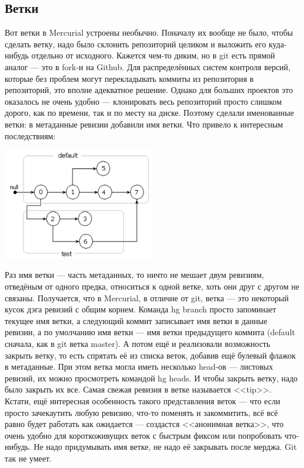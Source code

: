 \documentclass[a5paper]{article}
\begin{document}
\subsection{Ветки}

Вот ветки в Mercurial устроены необычно. Поначалу их вообще не было, чтобы сделать ветку, надо было склонить репозиторий целиком и выложить его куда-нибудь отдельно от исходного. Кажется чем-то диким, но в git есть прямой аналог --- это в fork-и на Github. Для распределённых систем контроля версий, которые без проблем могут перекладывать коммиты из репозитория в репозиторий, это вполне адекватное решение. Однако для больших проектов это оказалось не очень удобно --- клонировать весь репозиторий просто слишком дорого, как по времени, так и по месту на диске. Поэтому сделали именованные ветки: в метаданные ревизии добавили имя ветки. Что привело к интересным последствиям:

\begin{center}
	\includegraphics[width=0.5\textwidth]{mercurialBranches.png}
\end{center}

Раз имя ветки --- часть метаданных, то ничто не мешает двум ревизиям, отведёным от одного предка, относиться к одной ветке, хоть они друг с другом не связаны. Получается, что в Mercurial, в отличие от git, ветка --- это некоторый кусок дэга ревизий с общим корнем. Команда hg branch просто запоминает текущее имя ветки, а следующий коммит записывает имя ветки в данные ревизии, а по умолчанию имя ветки --- имя ветки предыдущего коммита (default сначала, как в git ветка master). А потом ещё и реализовали возможность закрыть ветку, то есть спрятать её из списка веток, добавив ещё булевый флажок в метаданные. При этом ветка могла иметь несколько head-ов --- листовых ревизий, их можно просмотреть командой hg heads. И чтобы закрыть ветку, надо было закрыть их все. Самая свежая ревизия в ветке называется <<tip>>. Кстати, ещё интересная особенность такого представления веток --- что если просто зачекаутить любую ревизию, что-то поменять и закоммитить, всё всё равно будет работать как ожидается --- создастся <<анонимная ветка>>, что очень удобно для короткоживущих веток с быстрым фиксом или попробовать что-нибудь. Не надо придумывать имя ветке, не надо её закрывать после мерджа. Git так не умеет.
\end{document}
